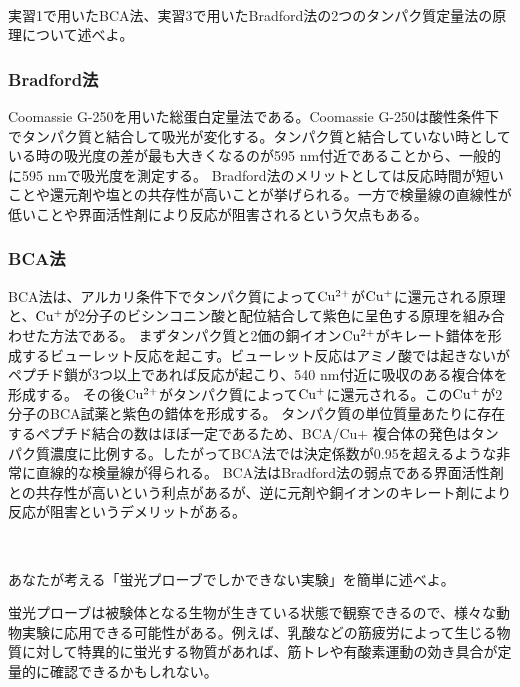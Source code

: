 \documentclass[a4paper,papersize,dvipdfmx]{jsarticle}
\begin{document}
\

\begin{tcolorbox}[colback=white,colbacktitle=black,coltitle=white,title={4. }]
実習1で用いたBCA法、実習3で用いたBradford法の2つのタンパク質定量法の原理について述べよ。
\end{tcolorbox}

\subsubsection*{Bradford法}
Coomassie G-250を用いた総蛋白定量法である。Coomassie G-250は酸性条件下でタンパク質と結合して吸光が変化する。タンパク質と結合していない時としている時の吸光度の差が最も大きくなるのが595 nm付近であることから、一般的に595 nmで吸光度を測定する。
Bradford法のメリットとしては反応時間が短いことや還元剤や塩との共存性が高いことが挙げられる。一方で検量線の直線性が低いことや界面活性剤により反応が阻害されるという欠点もある。

\subsubsection*{BCA法}
BCA法は、アルカリ条件下でタンパク質によって$\rm Cu^{2+}$が$\rm Cu^+$に還元される原理と、$\rm Cu^+$が2分子のビシンコニン酸と配位結合して紫色に呈色する原理を組み合わせた方法である。
まずタンパク質と2価の銅イオン$\rm Cu^{2+}$がキレート錯体を形成するビューレット反応を起こす。ビューレット反応はアミノ酸では起きないがペプチド鎖が3つ以上であれば反応が起こり、540 nm付近に吸収のある複合体を形成する。
その後$\rm Cu^{2+}$がタンパク質によって$\rm Cu^+$に還元される。この$\rm Cu^+$が2分子のBCA試薬と紫色の錯体を形成する。
タンパク質の単位質量あたりに存在するペプチド結合の数はほぼ一定であるため、BCA/Cu+ 複合体の発色はタンパク質濃度に比例する。したがってBCA法では決定係数が0.95を超えるような非常に直線的な検量線が得られる。
BCA法はBradford法の弱点である界面活性剤との共存性が高いという利点があるが、逆に元剤や銅イオンのキレート剤により反応が阻害というデメリットがある。

\

\begin{tcolorbox}[colback=white,colbacktitle=black,coltitle=white,title={5.}]
 あなたが考える「蛍光プローブでしかできない実験」を簡単に述べよ。
\end{tcolorbox}

蛍光プローブは被験体となる生物が生きている状態で観察できるので、様々な動物実験に応用できる可能性がある。例えば、乳酸などの筋疲労によって生じる物質に対して特異的に蛍光する物質があれば、筋トレや有酸素運動の効き具合が定量的に確認できるかもしれない。
\end{document}
